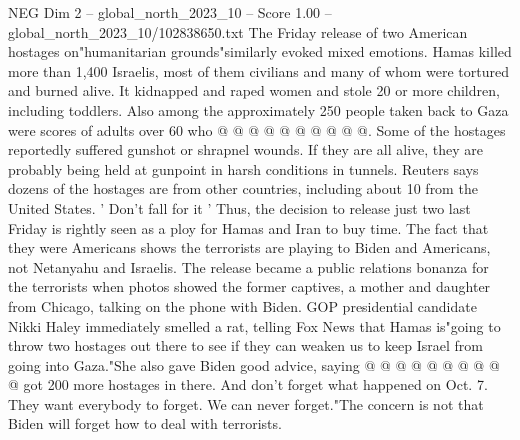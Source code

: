 \begin{textsample}{NEG Dim 2 – global\_north\_2023\_10 – Score 1.00 – global\_north\_2023\_10/102838650.txt}
The Friday release of two American hostages on"humanitarian grounds"similarly evoked mixed emotions.
Hamas killed more than 1,400 Israelis, most of them civilians and many of whom were tortured and burned alive.
It kidnapped and raped women and stole 20 or more children, including toddlers.
Also among the approximately 250 people taken back to Gaza were scores of adults over 60 who @ @ @ @ @ @ @ @ @ @.
Some of the hostages reportedly suffered gunshot or shrapnel wounds.
If they are all alive, they are probably being held at gunpoint in harsh conditions in tunnels.
Reuters says dozens of the hostages are from other countries, including about 10 from the United States. ' Don't fall for it ' Thus, the decision to release just two last Friday is rightly seen as a ploy for Hamas and Iran to buy time.
The fact that they were Americans shows the terrorists are playing to Biden and Americans, not Netanyahu and Israelis.
The release became a public relations bonanza for the terrorists when photos showed the former captives, a mother and daughter from Chicago, talking on the phone with Biden.
GOP presidential candidate Nikki Haley immediately smelled a rat, telling Fox News that Hamas is"going to throw two hostages out there to see if they can weaken us to keep Israel from going into Gaza."She also gave Biden good advice, saying @ @ @ @ @ @ @ @ @ @ got 200 more hostages in there.
And don't forget what happened on Oct. 7.
They want everybody to forget.
We can never forget."The concern is not that Biden will forget how to deal with terrorists.

\end{textsample}
